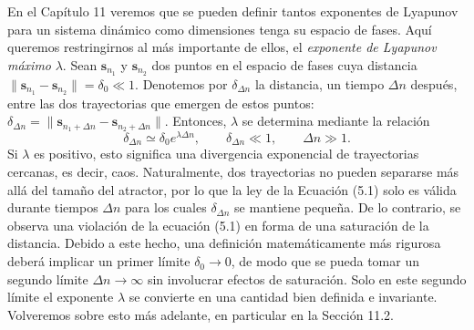 \documentclass[10pt,a4paper]{book}
\begin{document}
En el Capítulo 11 veremos que se pueden definir tantos exponentes de Lyapunov para un sistema dinámico como dimensiones tenga su espacio de fases. Aquí queremos restringirnos al más importante de ellos, el \textit{exponente de Lyapunov máximo} $\lambda$. Sean $\mathbf{s}_{n_1}$ y $\mathbf{s}_{n_2}$ dos puntos en el espacio de fases cuya distancia $\|\mathbf{s}_{n_1} - \mathbf{s}_{n_2}\| = \delta_0 \ll 1$. Denotemos por $\delta_{\Delta n}$ la distancia, un tiempo $\Delta n$ después, entre las dos trayectorias que emergen de estos puntos: $\delta_{\Delta n} = \|\mathbf{s}_{n_1+\Delta n} - \mathbf{s}_{n_2+\Delta n}\|$. Entonces, $\lambda$ se determina mediante la relación  
\begin{equation}
\delta_{\Delta n} \simeq \delta_0 e^{\lambda \Delta n}, \qquad \delta_{\Delta n} \ll 1, \qquad \Delta n \gg 1.
\end{equation}
Si $\lambda$ es positivo, esto significa una divergencia exponencial de trayectorias cercanas, es decir, caos. Naturalmente, dos trayectorias no pueden separarse más allá del tamaño del atractor, por lo que la ley de la Ecuación (5.1) solo es válida durante tiempos $\Delta n$ para los cuales $\delta_{\Delta n}$ se mantiene pequeña. De lo contrario, se observa una violación de la ecuación (5.1) en forma de una saturación de la distancia. Debido a este hecho, una definición matemáticamente más rigurosa deberá implicar un primer límite $\delta_0 \to 0$, de modo que se pueda tomar un segundo límite $\Delta n \to \infty$ sin involucrar efectos de saturación. Solo en este segundo límite el exponente $\lambda$ se convierte en una cantidad bien definida e invariante. Volveremos sobre esto más adelante, en particular en la Sección 11.2.

\bigskip
\end{document}
